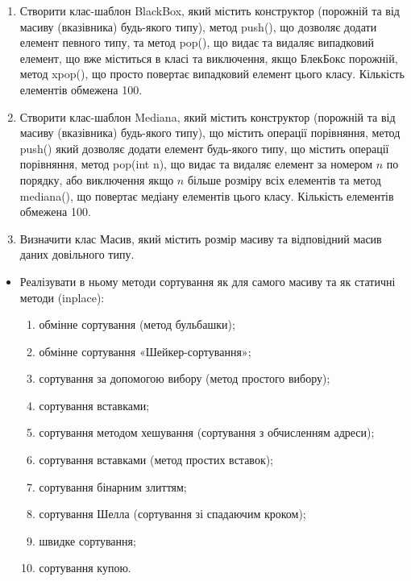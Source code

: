 \documentclass[]{article}
\begin{document}
\begin{enumerate}
\def\labelenumi{\arabic{enumi}.}
\item
  \protect\hypertarget{_Hlk65951836}{}{}Створити клас-шаблон BlackBox,
  який містить конструктор (порожній та від масиву (вказівника)
  будь-якого типу), метод push(), що дозволяє додати елемент певного
  типу, та метод pop(), що видає та видаляє випадковий елемент, що вже
  міститься в класі та виключення, якщо БлекБокс порожній, метод xpop(),
  що просто повертає випадковий елемент цього класу. Кількість елементів
  обмежена 100.
\item
  Створити клас-шаблон Mediana, який містить конструктор (порожній та
  від масиву (вказівника) будь-якого типу), що містить операції
  порівняння, метод push() який дозволяє додати елемент будь-якого типу,
  що містить операції порівняння, метод pop(int n), що видає та видаляє
  елемент за номером \(n\) по порядку, або виключення якщо \(n\) більше
  розміру всіх елементів та метод mediana(), що повертає медіану
  елементів цього класу. Кількість елементів обмежена 100.
\item
  Визначити клас Масив, який містить розмір масиву та відповідний масив
  даних довільного типу.
\end{enumerate}

\begin{itemize}
\item
  Реалізувати в ньому методи сортування як для самого масиву та як
  статичні методи (inplace):

  \begin{enumerate}
  \def\labelenumi{\arabic{enumi}.}
  \item
    обмінне сортування (метод бульбашки);
  \item
    обмінне сортування «Шейкер-сортування»;
  \item
    сортування за допомогою вибору (метод простого вибору);
  \item
    сортування вставками;
  \item
    сортування методом хешування (сортування з обчисленням адреси);
  \item
    сортування вставками (метод простих вставок);
  \item
    сортування бінарним злиттям;
  \item
    сортування Шелла (сортування зі спадаючим кроком);
  \item
    швидке сортування;
  \item
    сортування купою.
  \end{enumerate}
\end{itemize}
\end{document}
